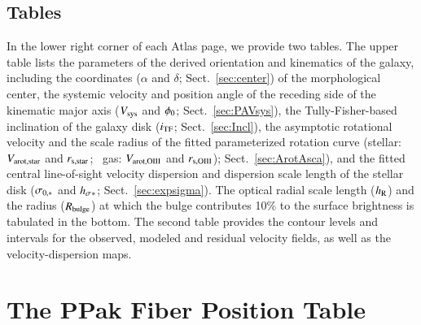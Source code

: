 \documentclass[traditabstract]{aa} %
\begin{document}
\subsection{Tables}

In the lower right corner of each Atlas page, we provide two tables.  The upper
table lists the parameters of the derived orientation and kinematics of the
galaxy, including the coordinates ($\alpha$ and $\delta$;
Sect.~\ref{sec:center}) of the morphological center, the systemic velocity and
position angle of the receding side of the kinematic major axis ($V_{\rm sys}$ and
$\phi_0$; Sect.~\ref{sec:PAVsys}), the Tully-Fisher-based inclination of the
galaxy disk ($i_{\rm TF}$; Sect.~\ref{sec:Incl}), the asymptotic rotational velocity
and the scale radius of the fitted parameterized rotation curve (stellar:
$V_{\rm arot,star}$ and $r_{\rm s,star}$; \oiii\ gas: $V_{\rm arot,OIII}$ and
$r_{\rm s,OIII}$); Sect.~\ref{sec:ArotAsca}), and the fitted central
line-of-sight velocity dispersion and
dispersion scale length of the stellar disk ($\sigma_{\rm 0,*}$ and $h_{\rm \sigma} {_*}$;
Sect.~\ref{sec:expsigma}).  The optical radial scale length ($h_{\rm R}$) and the
radius ($R_{\rm bulge}$) at which the bulge contributes 10\% to the surface brightness
is tabulated in the bottom.  The second table provides the contour levels and
intervals for the observed, modeled and residual velocity fields, as well as the
velocity-dispersion maps.

\onecolumn
\newpage
\section{The PPak Fiber Position Table}
\label{sec:PPakPosTab}





\end{document}
